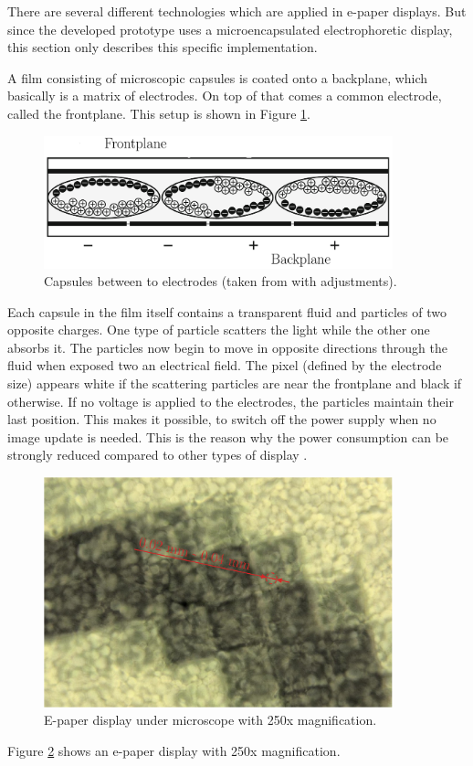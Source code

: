 There are several different technologies which are applied in e-paper displays.
But since the developed prototype uses a microencapsulated electrophoretic display, this section only describes this specific implementation.

A film consisting of microscopic capsules is coated onto a backplane, which basically is a matrix of electrodes.
On top of that comes a common electrode, called the frontplane.
This setup is shown in Figure \ref{theory:capsules}.

\begin{figure}[ht]
	\centering
	\includegraphics[width=0.9\textwidth]{2-theory/e-paper-display/graphics/capsules.pdf}
	\caption{Capsules between to electrodes (taken from \cite{amundson} with adjustments).\label{theory:capsules}}
\end{figure}

Each capsule in the film itself contains a transparent fluid and particles of two opposite charges.
One type of particle scatters the light while the other one absorbs it.
The particles now begin to move in opposite directions through the fluid when exposed two an electrical field. 
The pixel (defined by the electrode size) appears white if the scattering particles are near the frontplane and black if otherwise.
If no voltage is applied to the electrodes, the particles maintain their last position.
This makes it possible, to switch off the power supply when no image update is needed. 
This is the reason why the power consumption can be strongly reduced compared to other types of display \cite{amundson}.

\begin{figure}[ht]
	\centering
	\includegraphics[width=0.9\textwidth]{2-theory/e-paper-display/graphics/epaper_mikroskop.pdf}
	\caption{E-paper display under microscope with 250x magnification.\label{theory:micro}}
\end{figure}

Figure \ref{theory:micro} shows an e-paper display with 250x magnification.